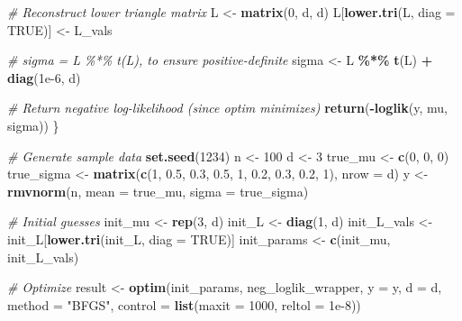 \documentclass[
]{article}
\newenvironment{Shaded}{\begin{snugshade}}{\end{snugshade}}
\newcommand{\AttributeTok}[1]{\textcolor[rgb]{0.13,0.29,0.53}{#1}}
\newcommand{\CommentTok}[1]{\textcolor[rgb]{0.56,0.35,0.01}{\textit{#1}}}
\newcommand{\ConstantTok}[1]{\textcolor[rgb]{0.56,0.35,0.01}{#1}}
\newcommand{\DecValTok}[1]{\textcolor[rgb]{0.00,0.00,0.81}{#1}}
\newcommand{\FloatTok}[1]{\textcolor[rgb]{0.00,0.00,0.81}{#1}}
\newcommand{\FunctionTok}[1]{\textcolor[rgb]{0.13,0.29,0.53}{\textbf{#1}}}
\newcommand{\NormalTok}[1]{#1}
\newcommand{\OtherTok}[1]{\textcolor[rgb]{0.56,0.35,0.01}{#1}}
\newcommand{\SpecialCharTok}[1]{\textcolor[rgb]{0.81,0.36,0.00}{\textbf{#1}}}
\newcommand{\StringTok}[1]{\textcolor[rgb]{0.31,0.60,0.02}{#1}}
\begin{document}
\begin{Shaded}
\begin{Highlighting}[]
  \CommentTok{\# Reconstruct lower triangle matrix}
\NormalTok{  L }\OtherTok{\textless{}{-}} \FunctionTok{matrix}\NormalTok{(}\DecValTok{0}\NormalTok{, d, d)}
\NormalTok{  L[}\FunctionTok{lower.tri}\NormalTok{(L, }\AttributeTok{diag =} \ConstantTok{TRUE}\NormalTok{)] }\OtherTok{\textless{}{-}}\NormalTok{ L\_vals}
  
  \CommentTok{\# sigma = L \%*\% t(L), to ensure positive{-}definite}
\NormalTok{  sigma }\OtherTok{\textless{}{-}}\NormalTok{ L }\SpecialCharTok{\%*\%} \FunctionTok{t}\NormalTok{(L) }\SpecialCharTok{+} \FunctionTok{diag}\NormalTok{(}\FloatTok{1e{-}6}\NormalTok{, d)}
  
  \CommentTok{\# Return negative log{-}likelihood (since optim minimizes)}
  \FunctionTok{return}\NormalTok{(}\SpecialCharTok{{-}}\FunctionTok{loglik}\NormalTok{(y, mu, sigma))}
\NormalTok{\}}

\CommentTok{\# Generate sample data}
\FunctionTok{set.seed}\NormalTok{(}\DecValTok{1234}\NormalTok{)}
\NormalTok{n }\OtherTok{\textless{}{-}} \DecValTok{100}
\NormalTok{d }\OtherTok{\textless{}{-}} \DecValTok{3}
\NormalTok{true\_mu }\OtherTok{\textless{}{-}} \FunctionTok{c}\NormalTok{(}\DecValTok{0}\NormalTok{, }\DecValTok{0}\NormalTok{, }\DecValTok{0}\NormalTok{)}
\NormalTok{true\_sigma }\OtherTok{\textless{}{-}} \FunctionTok{matrix}\NormalTok{(}\FunctionTok{c}\NormalTok{(}\DecValTok{1}\NormalTok{, }\FloatTok{0.5}\NormalTok{, }\FloatTok{0.3}\NormalTok{,}
                       \FloatTok{0.5}\NormalTok{, }\DecValTok{1}\NormalTok{, }\FloatTok{0.2}\NormalTok{,}
                       \FloatTok{0.3}\NormalTok{, }\FloatTok{0.2}\NormalTok{, }\DecValTok{1}\NormalTok{), }\AttributeTok{nrow =}\NormalTok{ d)}
\NormalTok{y }\OtherTok{\textless{}{-}} \FunctionTok{rmvnorm}\NormalTok{(n, }\AttributeTok{mean =}\NormalTok{ true\_mu, }\AttributeTok{sigma =}\NormalTok{ true\_sigma)}

\CommentTok{\# Initial guesses}
\NormalTok{init\_mu }\OtherTok{\textless{}{-}} \FunctionTok{rep}\NormalTok{(}\DecValTok{3}\NormalTok{, d)}
\NormalTok{init\_L }\OtherTok{\textless{}{-}} \FunctionTok{diag}\NormalTok{(}\DecValTok{1}\NormalTok{, d)}
\NormalTok{init\_L\_vals }\OtherTok{\textless{}{-}}\NormalTok{ init\_L[}\FunctionTok{lower.tri}\NormalTok{(init\_L, }\AttributeTok{diag =} \ConstantTok{TRUE}\NormalTok{)]}
\NormalTok{init\_params }\OtherTok{\textless{}{-}} \FunctionTok{c}\NormalTok{(init\_mu, init\_L\_vals)}

\CommentTok{\# Optimize}
\NormalTok{result }\OtherTok{\textless{}{-}} \FunctionTok{optim}\NormalTok{(init\_params, neg\_loglik\_wrapper, }\AttributeTok{y =}\NormalTok{ y, }\AttributeTok{d =}\NormalTok{ d, }\AttributeTok{method =} \StringTok{"BFGS"}\NormalTok{,}
                \AttributeTok{control =} \FunctionTok{list}\NormalTok{(}\AttributeTok{maxit =} \DecValTok{1000}\NormalTok{, }\AttributeTok{reltol =} \FloatTok{1e{-}8}\NormalTok{))}


\end{Highlighting}
\end{Shaded}
\end{document}
